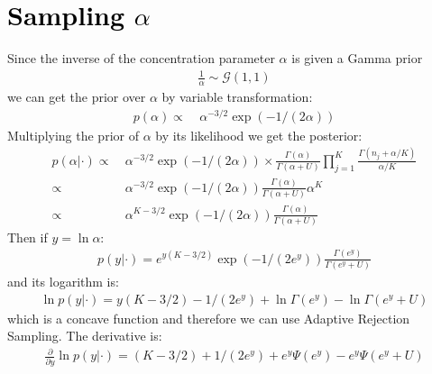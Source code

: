 \documentclass[smallextended]{svjour3}          %
\newcommand\alberto[1]{\textcolor{black}{#1}}
\begin{document}
\section{\alberto{Sampling $\alpha$}}
Since the inverse of the concentration parameter $\alpha$ is given a Gamma prior
\begin{align*}
	\frac{1}{\alpha} \sim \mathcal{G}(1,1)
\end{align*}
we can get the prior over $\alpha$ by variable transformation:
\begin{align*}
p(\alpha) 
\propto~& 
\alpha^{-3/2} \exp \left(-1/(2\alpha)\right)
\end{align*}
Multiplying the prior of $\alpha$ by its likelihood we get the posterior:
\begin{align*}
	p(\alpha | \cdot) 
	\propto~& 
	\alpha^{-3/2} \exp \left(-1/(2\alpha)\right)
	\times
	\frac{\Gamma(\alpha)}{\Gamma(\alpha+U)}
	\prod_{j=1}^{K}
	\frac{\Gamma(n_j + \alpha/K)}{\alpha/K}\\
	\propto~& 
	\alpha^{-3/2} \exp \left(-1/(2\alpha)\right)
	\frac{\Gamma(\alpha)}{\Gamma(\alpha+U)}\alpha^K \\
	\propto~&\alpha^{K-3/2} \exp \left(-1/(2\alpha)\right)
	\frac{\Gamma(\alpha)}{\Gamma(\alpha+U)}
\end{align*}
Then if $y=\ln \alpha$:
\begin{align*}
p(y | \cdot) = e^{y(K-3/2)}
\exp(-1/(2e^y))
\frac{\Gamma(e^y)}{\Gamma(e^y +U)}
\end{align*}
and its logarithm is:
\begin{align*}
\ln p(y | \cdot) = 
y(K-3/2)
-1/(2e^y)+
\ln\Gamma(e^y) - \ln\Gamma(e^y+U)
\end{align*}
which is a concave function and therefore we can use Adaptive Rejection Sampling. The derivative is:
\begin{align*}
\frac{\partial}{\partial y} \ln p(y | \cdot) = 
(K-3/2)
+1/(2e^y)+
e^y\Psi(e^y) - e^y\Psi(e^y+U)
\end{align*}

 
% 
% 

\end{document}
